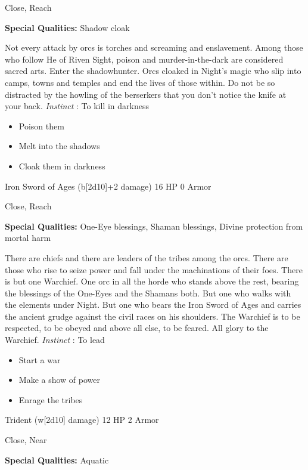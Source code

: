  Close, Reach


 \textbf{Special Qualities:}
 Shadow cloak


 Not every attack by orcs is torches and screaming and enslavement. Among those who follow He of Riven Sight, poison and murder-in-the-dark are considered sacred arts. Enter the shadowhunter. Orcs cloaked in Night's magic who slip into camps, towns and temples and end the lives of those within. Do not be so distracted by the howling of the berserkers that you don't notice the knife at your back. \emph{Instinct}
: To kill in darkness
\begin{itemize}
\item Poison them
\item Melt into the shadows
\item Cloak them in darkness

\end{itemize}




 Iron Sword of Ages (b[2d10]+2 damage) 16 HP 0 Armor


 Close, Reach


 \textbf{Special Qualities:}
 One-Eye blessings, Shaman blessings, Divine protection from mortal harm


 There are chiefs and there are leaders of the tribes among the orcs. There are those who rise to seize power and fall under the machinations of their foes. There is but one Warchief. One orc in all the horde who stands above the rest, bearing the blessings of the One-Eyes and the Shamans both. But one who walks with the elements under Night. But one who bears the Iron Sword of Ages and carries the ancient grudge against the civil races on his shoulders. The Warchief is to be respected, to be obeyed and above all else, to be feared. All glory to the Warchief. \emph{Instinct}
: To lead
\begin{itemize}
\item Start a war
\item Make a show of power
\item Enrage the tribes

\end{itemize}




 Trident (w[2d10] damage) 12 HP 2 Armor


 Close, Near


 \textbf{Special Qualities:}
 Aquatic


